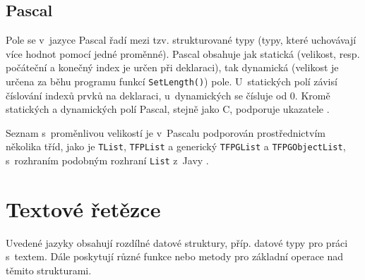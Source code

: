 \documentclass[onepage, a4paper, 12pt]{bakalarka}
\begin{document}
\subsection{Pascal}
Pole se v~jazyce Pascal řadí mezi tzv. strukturované typy (typy, které uchovávají více hodnot pomocí jedné proměnné). Pascal obsahuje jak statická (velikost, resp. počáteční a konečný index je určen při deklaraci), tak dynamická (velikost je určena za běhu programu funkcí \texttt{SetLength()}) pole. U~statických polí závisí číslování indexů prvků na deklaraci, u~dynamických se čísluje od 0. Kromě statických a dynamických polí Pascal, stejně jako C, podporuje ukazatele \cite{pas-guide-structured-types, pas-guide-static-array, pas-guide-dynamic-array, pas-guide-pointer}.\par
Seznam s~proměnlivou velikostí je v~Pascalu podporován prostřednictvím několika tříd, jako je \texttt{TList}, \texttt{TFPList} a generický \texttt{TFPGList} a \texttt{TFPGObjectList}, s~rozhraním podobným rozhraní \texttt{List} z~Javy \cite{pas-guide-tlist, pas-guide-tfplist, pas-guide-tfpglist, pas-guide-tfpgobjectlist}.

\section{Textové řetězce}\label{sec:strings}
Uvedené jazyky obsahují rozdílné datové struktury, příp. datové typy pro práci s~textem. Dále poskytují různé funkce nebo metody pro základní operace nad těmito strukturami.
\end{document}
